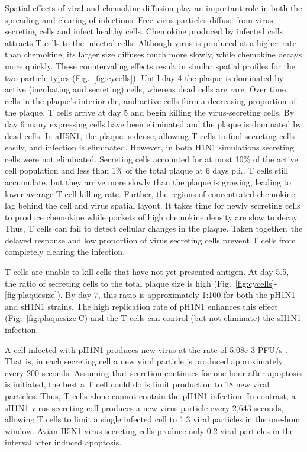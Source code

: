 \documentclass[10pt]{article}
\begin{document}
Spatial effects of viral and chemokine diffusion play an important role in both the spreading and clearing of infections.  Free virus particles diffuse from virus secreting cells and infect healthy cells.  Chemokine produced by infected cells attracts T cells to the infected cells.  Although virus is produced at a higher rate than chemokine, its larger size diffuses much more slowly, while chemokine decays more quickly.  These countervaling effects result in similar spatial profiles for the two particle types (Fig.~\ref{fig:cycells}). Until day 4 the plaque is dominated by active (incubating and secreting) cells, whereas dead cells are rare. Over time, cells in the plaque's interior die, and active cells form a decreasing proportion of the plaque. T cells arrive at day 5 and begin killing the virus-secreting cells. By day 6 many expressing cells have been eliminated and the plaque is dominated by dead cells.  In aH5N1, the plaque is dense, allowing T cells to find secreting cells easily, and infection is eliminated.  However, in both H1N1 simulations secreting cells were not eliminated.  Secreting cells accounted for at most 10\% of the active cell population and less than 1\% of the total plaque at 6 days p.i..  T cells still accumulate, but they arrive more slowly than the plaque is growing, leading to lower average T cell killing rate.  Further, the regions of concentrated chemokine lag behind the cell and virus spatial layout.  It takes time for newly secreting cells to produce chemokine while pockets of high chemokine density are slow to decay.  Thus, T cells can fail to detect cellular changes in the plaque.  Taken together, the delayed response and low proportion of virus secreting cells prevent T cells from completely clearing the infection.

T cells are unable to kill cells that have not yet presented antigen.  At day 5.5, the ratio of secreting cells to the total plaque size is high (Fig.~\ref{fig:cycells}-\ref{fig:plaquesize}). By day 7, this ratio is approximately 1:100 for both the pH1N1 and sH1N1 strains.  The high replication rate of pH1N1 enhances this effect (Fig.~\ref{fig:plaquesize}C) and the T cells can control (but not eliminate) the sH1N1 infection.

A cell infected with pH1N1 produces new virus at the rate of 5.08e-3 PFU/s \cite{Mitchell2011}.  That is, in each secreting cell a new viral particle is produced approximately every 200 seconds.  Assuming that secretion continues for one hour after apoptosis is initiated, the best a T cell could do is limit production to 18 new viral particles.  Thus, T cells alone cannot contain the pH1N1 infection.  In contrast, a sH1N1 virus-secreting cell produces a new virus particle every 2,643 seconds, allowing T cells to limit a single infected cell to 1.3 viral particles in the one-hour window.  Avian H5N1 virus-secreting cells produce only 0.2 viral particles in the interval after induced apoptosis. 
\end{document}
